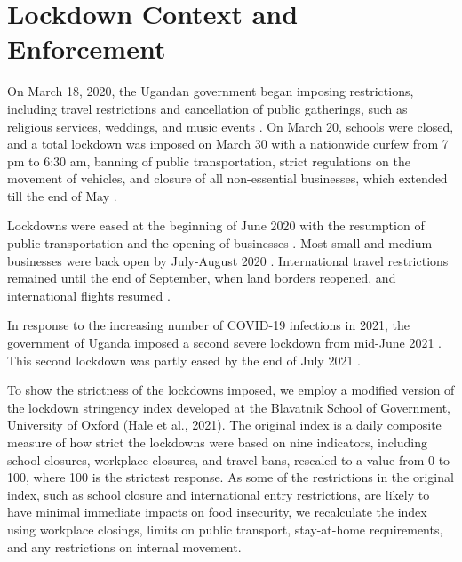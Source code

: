 \documentclass{wber}
\begin{document}
\section{Lockdown Context and Enforcement}\label{lockdown-context-and-enforcement}

On March 18, 2020, the Ugandan government began imposing restrictions,
including travel restrictions and cancellation of public gatherings,
such as religious services, weddings, and music events
\citep{Uganda-Bureau-of-Statistics2022}. On March 20, schools were
closed, and a total lockdown was imposed on March 30 with a nationwide
curfew from 7 pm to 6:30 am, banning of public transportation, strict
regulations on the movement of vehicles, and closure of all
non-essential businesses, which extended till the end of May
\citep{Alfonsi2021, Margini2020}.

Lockdowns were eased at the beginning of June 2020 with the resumption
of public transportation and the opening of businesses
\citep{Guloba2021, Monitor2020, Schwartz2021, Wagner2022}. Most small
and medium businesses were back open by July-August 2020
\citep{Alfonsi2021}. International travel restrictions remained until
the end of September, when land borders reopened, and international
flights resumed \citep{Guloba2021}.

In response to the increasing number of COVID-19 infections in 2021, the
government of Uganda imposed a second severe lockdown from mid-June 2021
\citep{Atamanov2022, Athumani2021}. This second lockdown was partly
eased by the end of July 2021 \citep{Biryabarema2021}.

To show the strictness of the lockdowns imposed, we employ a modified
version of the lockdown stringency index developed at the Blavatnik
School of Government, University of Oxford (Hale et al., 2021). The
original index is a daily composite measure of how strict the lockdowns
were based on nine indicators, including school closures, workplace
closures, and travel bans, rescaled to a value from 0 to 100, where 100
is the strictest response. As some of the restrictions in the original
index, such as school closure and international entry restrictions, are
likely to have minimal immediate impacts on food insecurity, we
recalculate the index using workplace closings, limits on public
transport, stay-at-home requirements, and any restrictions on internal
movement.
\end{document}

